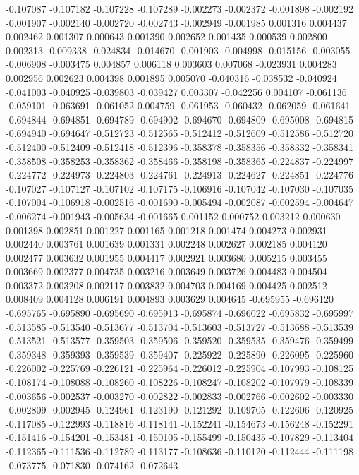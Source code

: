-0.107087
-0.107182
-0.107228
-0.107289
-0.002273
-0.002372
-0.001898
-0.002192
-0.001907
-0.002140
-0.002720
-0.002743
-0.002949
-0.001985
0.001316
0.004437
0.002462
0.001307
0.000643
0.001390
0.002652
0.001435
0.000539
0.002800
0.002313
-0.009338
-0.024834
-0.014670
-0.001903
-0.004998
-0.015156
-0.003055
-0.006908
-0.003475
0.004857
0.006118
0.003603
0.007068
-0.023931
0.004283
0.002956
0.002623
0.004398
0.001895
0.005070
-0.040316
-0.038532
-0.040924
-0.041003
-0.040925
-0.039803
-0.039427
0.003307
-0.042256
0.004107
-0.061136
-0.059101
-0.063691
-0.061052
0.004759
-0.061953
-0.060432
-0.062059
-0.061641
-0.694844
-0.694851
-0.694789
-0.694902
-0.694670
-0.694809
-0.695008
-0.694815
-0.694940
-0.694647
-0.512723
-0.512565
-0.512412
-0.512609
-0.512586
-0.512720
-0.512400
-0.512409
-0.512418
-0.512396
-0.358378
-0.358356
-0.358332
-0.358341
-0.358508
-0.358253
-0.358362
-0.358466
-0.358198
-0.358365
-0.224837
-0.224997
-0.224772
-0.224973
-0.224803
-0.224761
-0.224913
-0.224627
-0.224851
-0.224776
-0.107027
-0.107127
-0.107102
-0.107175
-0.106916
-0.107042
-0.107030
-0.107035
-0.107004
-0.106918
-0.002516
-0.001690
-0.005494
-0.002087
-0.002594
-0.004647
-0.006274
-0.001943
-0.005634
-0.001665
0.001152
0.000752
0.003212
0.000630
0.001398
0.002851
0.001227
0.001165
0.001218
0.001474
0.004273
0.002931
0.002440
0.003761
0.001639
0.001331
0.002248
0.002627
0.002185
0.004120
0.002477
0.003632
0.001955
0.004417
0.002921
0.003680
0.005215
0.003455
0.003669
0.002377
0.004735
0.003216
0.003649
0.003726
0.004483
0.004504
0.003372
0.003208
0.002117
0.003832
0.004703
0.004169
0.004425
0.002512
0.008409
0.004128
0.006191
0.004893
0.003629
0.004645
-0.695955
-0.696120
-0.695765
-0.695890
-0.695690
-0.695913
-0.695874
-0.696022
-0.695832
-0.695997
-0.513585
-0.513540
-0.513677
-0.513704
-0.513603
-0.513727
-0.513688
-0.513539
-0.513521
-0.513577
-0.359503
-0.359506
-0.359520
-0.359535
-0.359476
-0.359499
-0.359348
-0.359393
-0.359539
-0.359407
-0.225922
-0.225890
-0.226095
-0.225960
-0.226002
-0.225769
-0.226121
-0.225964
-0.226012
-0.225904
-0.107993
-0.108125
-0.108174
-0.108088
-0.108260
-0.108226
-0.108247
-0.108202
-0.107979
-0.108339
-0.003656
-0.002537
-0.003270
-0.002822
-0.002833
-0.002766
-0.002602
-0.003330
-0.002809
-0.002945
-0.124961
-0.123190
-0.121292
-0.109705
-0.122606
-0.120925
-0.117085
-0.122993
-0.118816
-0.118141
-0.152241
-0.154673
-0.156248
-0.152291
-0.151416
-0.154201
-0.153481
-0.150105
-0.155499
-0.150435
-0.107829
-0.113404
-0.112365
-0.111536
-0.112789
-0.113177
-0.108636
-0.110120
-0.112444
-0.111198
-0.073775
-0.071830
-0.074162
-0.072643
